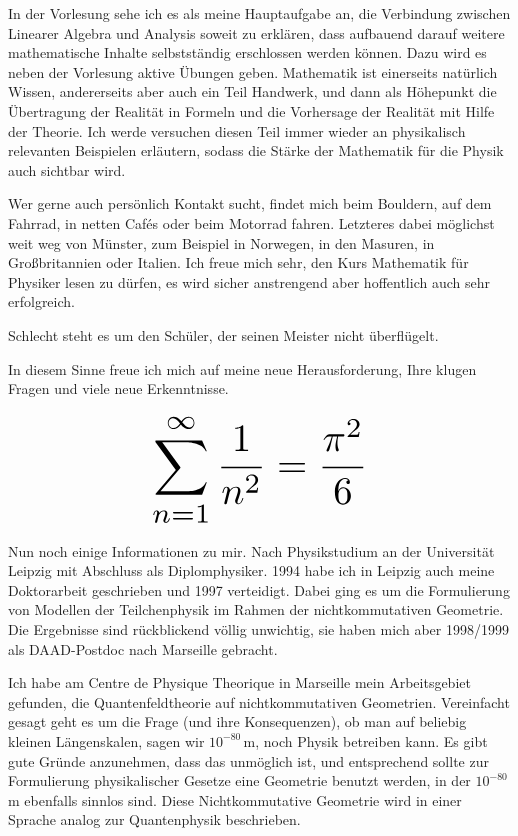 \begin{multicols}{2}
In der Vorlesung sehe ich es als meine Hauptaufgabe an, die Verbindung zwischen Linearer Algebra und Analysis soweit zu erklären, dass aufbauend darauf weitere mathematische Inhalte selbstständig erschlossen werden können. Dazu wird es neben der Vorlesung aktive Übungen geben. Mathematik ist einerseits natürlich Wissen, andererseits aber auch ein Teil Handwerk, und dann als Höhepunkt die Übertragung der Realität in Formeln und die Vorhersage der Realität mit Hilfe der Theorie. Ich werde versuchen diesen Teil immer wieder an physikalisch relevanten Beispielen erläutern, sodass die Stärke der Mathematik für die Physik auch sichtbar wird.

Wer gerne auch persönlich Kontakt sucht, findet mich beim Bouldern, auf dem Fahrrad, in netten Cafés oder beim Motorrad fahren. Letzteres dabei möglichst weit weg von Münster, zum Beispiel in Norwegen, in den Masuren, in Großbritannien oder Italien. Ich freue mich sehr, den Kurs Mathematik für Physiker lesen zu dürfen, es wird sicher anstrengend aber hoffentlich auch sehr erfolgreich.

Schlecht steht es um den Schüler, der seinen Meister nicht überflügelt.

In diesem Sinne freue ich mich auf meine neue Herausforderung, Ihre klugen Fragen und viele neue Erkenntnisse.

\[
\resizebox{0.45\hsize}{!}{$\displaystyle\sum_{n = 1}^\infty \frac{1}{n^2} = \frac{\pi^2}{6}$}
\]

Nun noch einige Informationen zu mir. Nach Physikstudium an der Universität Leipzig mit Abschluss als Diplomphysiker. 1994 habe ich in Leipzig auch meine Doktorarbeit geschrieben und 1997 verteidigt. Dabei ging es um die Formulierung von Modellen der Teilchenphysik im Rahmen der nichtkommutativen Geometrie. Die Ergebnisse sind rückblickend völlig unwichtig, sie haben mich aber 1998/1999 als DAAD-Postdoc nach Marseille gebracht.

Ich habe am Centre de Physique Theorique in Marseille mein Arbeitsgebiet gefunden, die Quantenfeldtheorie auf nichtkommutativen Geometrien. Vereinfacht gesagt geht es um die Frage (und ihre Konsequenzen), ob man auf beliebig kleinen Längenskalen, sagen wir $10^{-80}$\,m, noch Physik betreiben kann. Es gibt gute Gründe anzunehmen, dass das unmöglich ist, und entsprechend sollte zur Formulierung physikalischer Gesetze eine Geometrie benutzt werden, in der $10^{-80}$\,m ebenfalls sinnlos sind. Diese Nichtkommutative Geometrie wird in einer Sprache analog zur Quantenphysik beschrieben.


\end{multicols}
